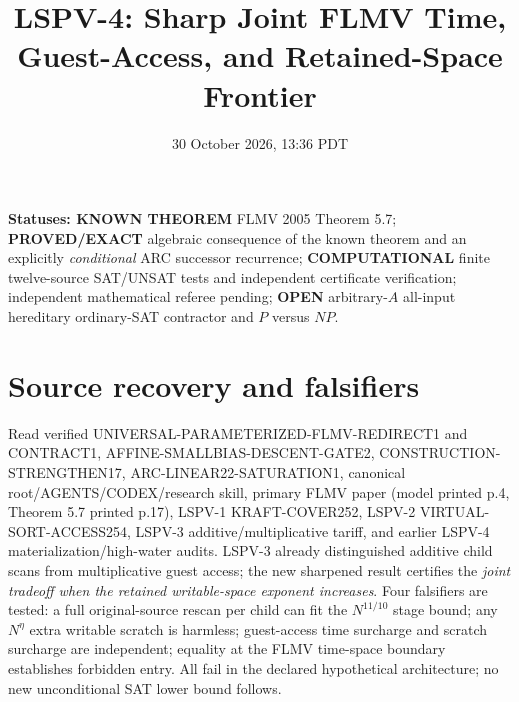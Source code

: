\documentclass[10pt]{article}
\title{LSPV-4: Sharp Joint FLMV Time, Guest-Access, and Retained-Space Frontier}
\date{30 October 2026, 13:36 PDT}
\begin{document}
\maketitle
\noindent\textbf{Statuses: KNOWN THEOREM} FLMV 2005 Theorem 5.7; \textbf{PROVED/EXACT} algebraic consequence of the known theorem and an explicitly \emph{conditional} ARC successor recurrence; \textbf{COMPUTATIONAL} finite twelve-source SAT/UNSAT tests and independent certificate verification; independent mathematical referee pending; \textbf{OPEN} arbitrary-$A$ all-input hereditary ordinary-SAT contractor and $P$ versus $NP$.
\section{Source recovery and falsifiers}
Read verified UNIVERSAL-PARAMETERIZED-FLMV-REDIRECT1 and CONTRACT1, AFFINE-SMALLBIAS-DESCENT-GATE2, CONSTRUCTION-STRENGTHEN17, ARC-LINEAR22-SATURATION1, canonical root/AGENTS/CODEX/research skill, primary FLMV paper (model printed p.4, Theorem 5.7 printed p.17), LSPV-1 KRAFT-COVER252, LSPV-2 VIRTUAL-SORT-ACCESS254, LSPV-3 additive/multiplicative tariff, and earlier LSPV-4 materialization/high-water audits. LSPV-3 already distinguished additive child scans from multiplicative guest access; the new sharpened result certifies the \emph{joint tradeoff when the retained writable-space exponent increases}. Four falsifiers are tested: a full original-source rescan per child can fit the $N^{11/10}$ stage bound; any $N^{\eta}$ extra writable scratch is harmless; guest-access time surcharge and scratch surcharge are independent; equality at the FLMV time-space boundary establishes forbidden entry. All fail in the declared hypothetical architecture; no new unconditional SAT lower bound follows.
\end{document}
